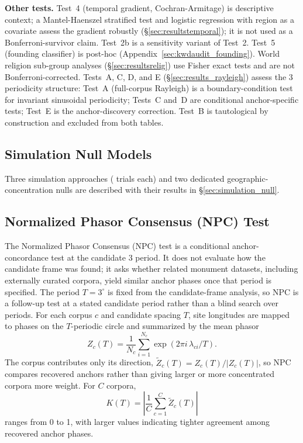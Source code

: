 \textbf{Other tests.}
Test~4 (temporal gradient, Cochran-Armitage) is descriptive context;
a Mantel-Haenszel stratified test and logistic regression with region as a
covariate assess the gradient robustly (\S\ref{sec:resultstemporal});
it is not used as a Bonferroni-survivor claim.
Test~2b is a sensitivity variant of Test~2.
Test~5 (founding classifier) is post-hoc (Appendix~\ref{sec:kwdaudit_founding}).
World religion sub-group analyses (\S\ref{sec:resultsrelig}) use Fisher exact tests and are not Bonferroni-corrected.
Tests~A, C, D, and E (\S\ref{sec:results_rayleigh}) assess the
3\textdegree{} periodicity structure: Test~A (full-corpus Rayleigh) is a
boundary-condition test for invariant sinusoidal periodicity;
Tests~C and~D are conditional anchor-specific tests; Test~E is the anchor-discovery
correction. Test~B is tautological by construction and excluded from both
tables.

\subsection{Simulation Null Models}
\label{sec:methods_simulation}

Three simulation approaches (
\simNperms{} trials each) and two dedicated geographic-concentration nulls
are described with their results in \S\ref{sec:simulation_null}.

\subsection{Normalized Phasor Consensus (NPC) Test}
\label{sec:npc_methods}

The Normalized Phasor Consensus (NPC) test is a conditional
anchor-concordance test at the candidate 3\textdegree{} period. It does
not evaluate how the candidate frame was found; it asks whether
related monument datasets, including externally curated corpora, yield
similar anchor phases once that period is specified. The period
$T=3^\circ$ is fixed from the candidate-frame analysis, so NPC is a
follow-up test at a stated candidate period rather than a blind search
over periods.
For each corpus $c$ and candidate spacing $T$, site longitudes are
mapped to phases on the $T$-periodic circle and summarized by the mean
phasor
\[
  Z_c(T) = \frac{1}{N_c}\sum_{i=1}^{N_c}
  \exp\!\left(2\pi i\,\lambda_{ci}/T\right).
\]
The corpus contributes only its direction,
$\widetilde{Z}_c(T)=Z_c(T)/|Z_c(T)|$, so NPC compares recovered
anchors rather than giving larger or more concentrated corpora more
weight. For $C$ corpora,
\[
  K(T)=\left|\frac{1}{C}\sum_{c=1}^{C}\widetilde{Z}_c(T)\right|
\]
ranges from 0 to 1, with larger values indicating tighter agreement
among recovered anchor phases.

